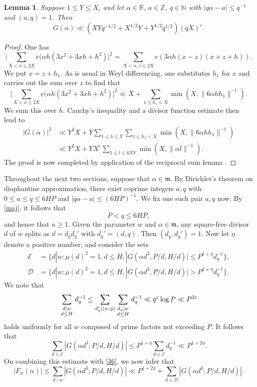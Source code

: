 \documentclass[reqno]{amsart}
\newcommand{\multsum}[2]{\sum_{{\scriptstyle #1}\atop {\scriptstyle #2}}}
\newtheorem{lemma}[thm]{Lemma}
\numberwithin{equation}{section}
\begin{document}
\begin{lemma}\label{L71} Suppose $1\le Y\le X$, and let $\alpha\in\mathbb R$, $a\in\mathbb Z$, $q\in\mathbb N$ with $|q\alpha-a|\le q^{-1}$ and $(a,q)=1$. Then
$$ G(\alpha)\ll (XYq^{-1/2} + X^{1/2}Y + Y^{1/2}q^{1/2}) (qX)^\varepsilon. $$
\end{lemma} 

\begin{proof}
One has
$$ \Big| \sum_{X<x\le 2X} e(\alpha  h(3x^2+3xh +h^2)\Big|^2 = \sum_{X<x,z\le 2X} e(3\alpha h(x-z)(x+z+h)). $$
We put $x=z+h_1$. As is usual in Weyl differencing, one substitutes $h_1$ for $x$ and carries out the sum over $z$ to find that
$$ \Big| \sum_{X<x\le 2X} e(\alpha  h(3x^2+3xh +h^2)\Big|^2 \ll X + \sum_{1\le h_1< X} \min(X, \|6\alpha hh_1\|^{-1}).$$
We sum this over $h$. Cauchy's inequality and a divisor function estimate  then lead to
\begin{align*}   |G(\alpha)|^2 & \ll Y^2X + Y \sum_{1\le h\le Y} \sum_{1\le h_1<X} \min(X, \|6\alpha hh_1\|^{-1}) \\
& \ll Y^2X + YX^\varepsilon \sum_{1\le l\le 6XY} \min(X, \|\alpha l\|^{-1}).
\end{align*}
The proof is now completed by application of the reciprocal sum lemma \cite[Lemma 2.2]{hlm}.
\end{proof}

Throughout the next two sections, suppose that \(\alpha \in \mathfrak{m}\). By Dirichlet's theorem on diophantine approximation, there exist coprime integers \(a, q\) with \(0 \leq a \leq q \leq 6HP\) and \(|q\alpha - a| \leq (6HP)^{-1}\). We fix one such pair \(a,q\) now. By \eqref{maj}, it follows that 
$$ P < q \leq 6HP,$$
and hence that $a\ge 1$.
Given the parameter \(w\) and \(\alpha \in \mathfrak m\), any {square-free} divisor \(d\) of \(w\) splits as \(d = d_q d_q'\) with \(d_q' = (d, q)\). Then \((d_q, d_q') = 1\).
Now let \(\eta\) denote a positive number, and consider the sets
\begin{align*}
\mathscr{E} &= \{d|w : \mu(d)^2=1, d \leq H, |G(\alpha d^3, P/d, H/d)| \leq P^{1+\eta} d_q^{-1}\},\\
\mathscr{D} &=  \{d|w : \mu(d)^2=1,  d \leq H, |G(\alpha d^3, P/d, H/d)| > P^{1+\eta} d_q^{-1}\}.
\end{align*}
We note that
\begin{equation}\label{72} \multsum{d\mid w}{d\le H} d_q^{-1} \le \sum_{d'_q\mid (w,q)} \multsum{d_q\mid w}{d\le H} d_q^{-1} \ll q^\varepsilon \log P \ll P^{2\varepsilon} \end{equation}
holds uniformly for all  \(w\) composed of prime factors not exceeding \(P\). It follows that
$$ \sum_{d \in \mathscr E} \left| G(\alpha d^3; P/d, H/d) \right| \leq P^{1+\eta} \sum_{d\in \mathscr E} d_q^{-1} \ll P^{1+2\eta}.$$
On combining this estimate with \eqref{36}, we now infer that
\begin{equation}\label{74} |F_w(\alpha)| \leq \sum_{d \mid w} \left| G(\alpha d^3; P/d, H/d) \right| \ll P^{1+2\eta} + \sum_{d \in \mathscr D} \left| G(\alpha d^3; P/d, H/d) \right|.\end{equation}
\end{document}
